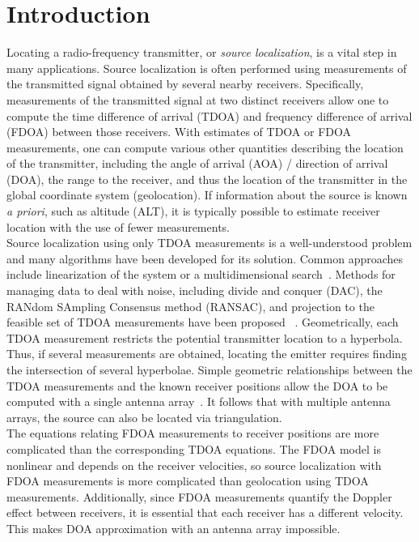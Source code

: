 \section{Introduction}
\label{s:intro}
Locating a radio-frequency transmitter, or \emph{source localization}, is a vital step in many applications. Source localization is often performed using measurements of the transmitted signal obtained by several nearby receivers. Specifically, measurements of the transmitted signal at two distinct receivers allow one to compute the time difference of arrival (TDOA) and frequency difference of arrival (FDOA) between those receivers. With estimates of TDOA or FDOA measurements, one can compute various other quantities describing the location of the transmitter, including the angle of arrival (AOA) / direction of arrival (DOA), the range to the receiver, and thus the location of the transmitter in the global coordinate system (geolocation). If information about the source is known {\em a priori}, such as altitude (ALT), it is typically possible to estimate receiver location with the use of fewer measurements.\\

Source localization using only TDOA measurements is a well-understood problem and many algorithms have been developed for its solution. Common approaches include linearization of the system or a multidimensional search~\cite{Torrieri1984}. Methods for managing data to deal with noise, including divide and conquer (DAC), the RANdom SAmpling Consensus method (RANSAC), and projection to the feasible set of TDOA measurements have been proposed ~\cite{Cameron,Abel1990,Li2009,Compagnoni2017}. Geometrically, each TDOA measurement restricts the potential transmitter location to a hyperbola. Thus, if several measurements are obtained, locating the emitter requires finding the intersection of several hyperbolae. Simple geometric relationships between the TDOA measurements and the known receiver positions allow the DOA to be computed with a single antenna array~\cite{Benesty2008}. It follows that with multiple antenna arrays, the source can also be located via triangulation. \\

The equations relating FDOA measurements to receiver positions are more complicated than the corresponding TDOA equations. The FDOA model is nonlinear and depends on the receiver velocities, so source localization with FDOA measurements is more complicated than geolocation using TDOA measurements. Additionally, since FDOA measurements quantify the Doppler effect between receivers, it is essential that each receiver has a different velocity. This makes DOA approximation with an antenna array impossible. \\

